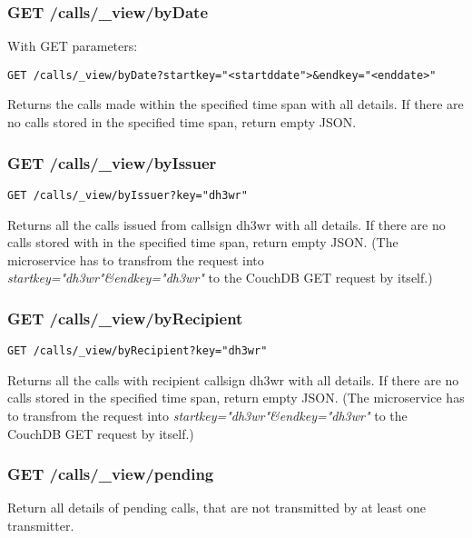 \subsubsection{GET /calls/\_view/byDate}
With GET parameters:

\begin{verbatim}
GET /calls/_view/byDate?startkey="<startddate">&endkey="<enddate>"
\end{verbatim}

Returns the calls made within the specified time span with all details. If there are no calls stored in the specified time span, return empty JSON.

\subsubsection{GET /calls/\_view/byIssuer}
\begin{verbatim}
GET /calls/_view/byIssuer?key="dh3wr"
\end{verbatim}

Returns all the calls issued from callsign dh3wr with all details. If there are no calls stored with in the specified time span, return empty JSON. (The microservice has to transfrom the request into \textit{startkey="dh3wr"\&endkey="dh3wr"} to the CouchDB GET request by itself.)

\subsubsection{GET /calls/\_view/byRecipient}
\begin{verbatim}
GET /calls/_view/byRecipient?key="dh3wr"
\end{verbatim}

Returns all the calls with recipient callsign dh3wr with all details. If there are no calls stored in the specified time span, return empty JSON. (The microservice has to transfrom the request into \textit{startkey="dh3wr"\&endkey="dh3wr"} to the CouchDB GET request by itself.)


\subsubsection{GET /calls/\_view/pending}

Return all details of pending calls, that are not transmitted by at least one transmitter.

